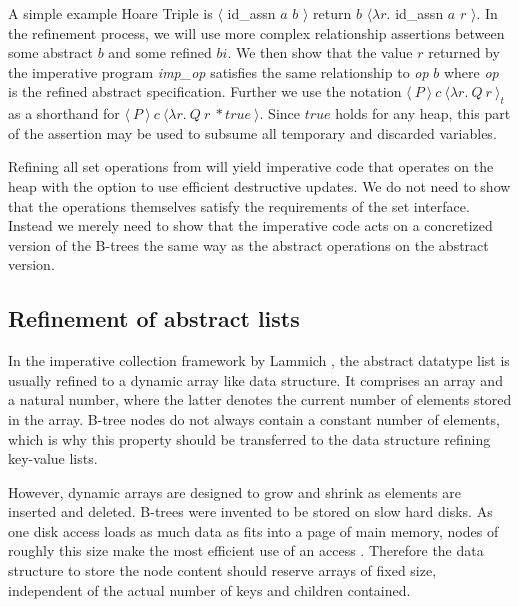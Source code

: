 A simple example Hoare Triple is 
$\langle$ id\_assn $a$ $b$ $\rangle$ return $b$ $\langle \lambda r.$ id\_assn $a$ $r$ $\rangle$.
In the refinement process, we will use more complex relationship assertions
between some abstract $b$ and some refined $bi$.
We then show that the value $r$ returned
by the imperative program \textit{imp\_op} satisfies the same relationship
to \textit{op} $b$ where \textit{op} is the refined abstract specification.
Further we use the notation $\langle\ P\ \rangle\ c\ \langle \lambda r.\ Q\ r\ \rangle_t$
as a shorthand for $\langle\ P\ \rangle\ c\ \langle \lambda r.\ Q\ r\ * true\ \rangle$.
Since $true$ holds for any heap, this part of the assertion
may be used to subsume all temporary and discarded variables.

Refining all set operations from 
will yield imperative code that operates on the heap
with the  option to use efficient destructive updates.
We do not need to show that the operations themselves
satisfy the requirements of the set interface.
Instead we merely need to show that the imperative code
acts on a concretized version of the B-trees
the same way as the abstract operations on the abstract version.


\subsection{Refinement of abstract lists}

In the imperative collection framework by Lammich
\parencite{DBLP:journals/jar/Lammich19},
the abstract datatype list is usually
refined to a dynamic array like data structure.
It comprises an array and a natural number,
where the latter denotes the current number of elements
stored in the array.
B-tree nodes do not always contain a constant number of elements,
which is why this property should be transferred to
the data structure refining key-value lists. 

However, dynamic arrays are designed to grow and shrink
as elements are inserted and deleted.
B-trees were invented to be stored on slow hard disks.
As one disk access loads as much data as fits into a page of main memory,
nodes of roughly this size make the most efficient use of an access
\parencite{DBLP:journals/acta/BayerM72}.
Therefore the data structure to store the node content
should reserve arrays of fixed size, independent
of the actual number of keys and children contained.

